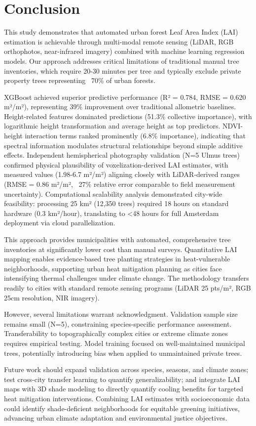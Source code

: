 \section{Conclusion}

This study demonstrates that automated urban forest Leaf Area Index (LAI) estimation is achievable through multi-modal remote sensing (LiDAR, RGB orthophotos, near-infrared imagery) combined with machine learning regression models. Our approach addresses critical limitations of traditional manual tree inventories, which require 20-30 minutes per tree and typically exclude private property trees representing ~70\% of urban forests.

XGBoost achieved superior predictive performance (R² = 0.784, RMSE = 0.620 m²/m²), representing 39\% improvement over traditional allometric baselines. Height-related features dominated predictions (51.3\% collective importance), with logarithmic height transformation and average height as top predictors. NDVI-height interaction terms ranked prominently (6.8\% importance), indicating that spectral information modulates structural relationships beyond simple additive effects. Independent hemispherical photography validation (N=5 Ulmus trees) confirmed physical plausibility of voxelization-derived LAI estimates, with measured values (1.98-6.7 m²/m²) aligning closely with LiDAR-derived ranges (RMSE = 0.86 m²/m², ~27\% relative error comparable to field measurement uncertainty). Computational scalability analysis demonstrated city-wide feasibility: processing 25 km² (12,350 trees) required 18 hours on standard hardware (0.3 km²/hour), translating to <48 hours for full Amsterdam deployment via cloud parallelization.

This approach provides municipalities with automated, comprehensive tree inventories at significantly lower cost than manual surveys. Quantitative LAI mapping enables evidence-based tree planting strategies in heat-vulnerable neighborhoods, supporting urban heat mitigation planning as cities face intensifying thermal challenges under climate change. The methodology transfers readily to cities with standard remote sensing programs (LiDAR 25 pts/m², RGB 25cm resolution, NIR imagery).

However, several limitations warrant acknowledgment. Validation sample size remains small (N=5), constraining species-specific performance assessment. Transferability to topographically complex cities or extreme climate zones requires empirical testing. Model training focused on well-maintained municipal trees, potentially introducing bias when applied to unmaintained private trees.

Future work should expand validation across species, seasons, and climate zones; test cross-city transfer learning to quantify generalizability; and integrate LAI maps with 3D shade modeling to directly quantify cooling benefits for targeted heat mitigation interventions. Combining LAI estimates with socioeconomic data could identify shade-deficient neighborhoods for equitable greening initiatives, advancing urban climate adaptation and environmental justice objectives.

